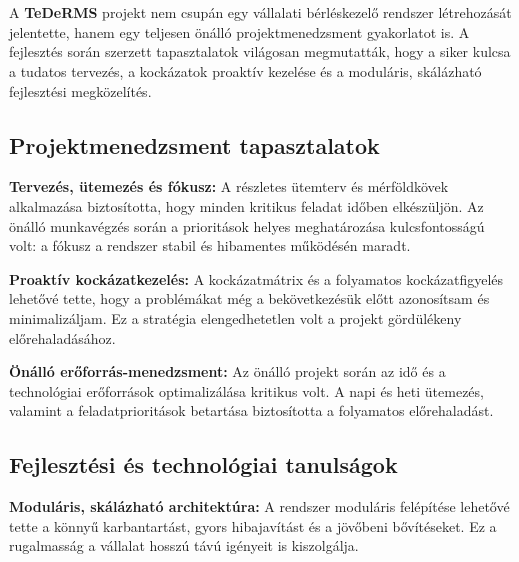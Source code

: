 \chapter{\lessons}

A \textbf{TeDeRMS} projekt nem csupán egy vállalati bérléskezelő rendszer létrehozását jelentette, 
hanem egy teljesen önálló projektmenedzsment gyakorlatot is. 
A fejlesztés során szerzett tapasztalatok világosan megmutatták, hogy a siker kulcsa a tudatos tervezés, 
a kockázatok proaktív kezelése és a moduláris, skálázható fejlesztési megközelítés.

\section{Projektmenedzsment tapasztalatok}

\textbf{Tervezés, ütemezés és fókusz:}  
A részletes ütemterv és mérföldkövek alkalmazása biztosította, hogy minden kritikus feladat időben elkészüljön.  
Az önálló munkavégzés során a prioritások helyes meghatározása kulcsfontosságú volt: 
a fókusz a rendszer stabil és hibamentes működésén maradt.

\textbf{Proaktív kockázatkezelés:}  
A kockázatmátrix és a folyamatos kockázatfigyelés lehetővé tette, hogy a problémákat még a bekövetkezésük előtt azonosítsam és minimalizáljam.  
Ez a stratégia elengedhetetlen volt a projekt gördülékeny előrehaladásához.  

\textbf{Önálló erőforrás-menedzsment:}  
Az önálló projekt során az idő és a technológiai erőforrások optimalizálása kritikus volt.  
A napi és heti ütemezés, valamint a feladatprioritások betartása biztosította a folyamatos előrehaladást.

\section{Fejlesztési és technológiai tanulságok}

\textbf{Moduláris, skálázható architektúra:}  
A rendszer moduláris felépítése lehetővé tette a könnyű karbantartást, gyors hibajavítást és a jövőbeni bővítéseket.  
Ez a rugalmasság a vállalat hosszú távú igényeit is kiszolgálja.


